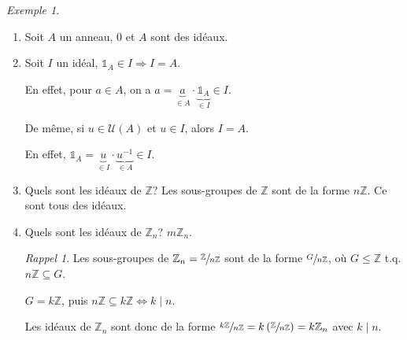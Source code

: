 \documentclass{report}
\theoremstyle{definition}
\theoremstyle{remark}
\newtheorem*{exem}{Exemple}
\newtheorem*{rapp}{Rappel}
\def\lte{\leqslant}
\def\ZZ{\mathbb{Z}}
\def\id{\mathds{1}}
\begin{document}
	\begin{exem}
		\begin{enumerate}
			\item Soit $A$ un anneau, $0$ et $A$ sont des id\'eaux.
			\item Soit $I$ un id\'eal, $\id_A \in I \Rightarrow I=A$.

			En effet, pour $a \in A$, on a $a=\underbrace{a}_{\in A} \cdot \underbrace{\id_A}_{\in I} \in I$.

			De m\^eme, si $u \in \mathcal{U}(A)$ et $u \in I$, alors $I=A$.

			En effet, $\id_A=\underbrace{u}_{\in I} \cdot \underbrace{u^{-1}}_{\in A} \in I$.
			\item Quels sont les id\'eaux de $\ZZ$? Les sous-groupes de $\ZZ$ sont de la forme $n\ZZ$. Ce sont tous des id\'eaux.
			\item Quels sont les id\'eaux de $\ZZ_n$? $m\ZZ_n$.
			\begin{rapp}
				Les sous-groupes de $\ZZ_n = \sfrac{\ZZ}{n\ZZ}$ sont de la forme $\sfrac{G}{n\ZZ}$, o\`u $G \lte \ZZ$ t.q. $n\ZZ \subseteq G$.
			\end{rapp}

			$G = k\ZZ$, puis $n\ZZ \subseteq k\ZZ \Leftrightarrow k \mid n$.

			Les id\'eaux de $\ZZ_n$ sont donc de la forme $\sfrac{k\ZZ}{n\ZZ} = k\left(\sfrac{\ZZ}{n\ZZ}\right) = k\ZZ_n$ avec $k \mid n$.


\end{enumerate}
\end{exem}
\end{document}
